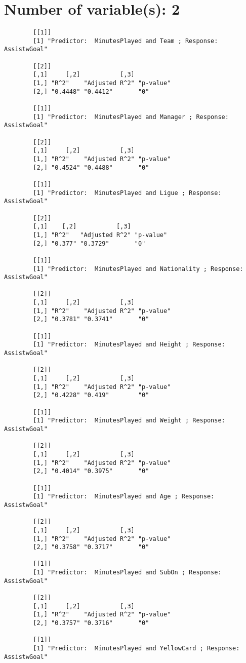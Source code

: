 \documentclass[12pt]{article}
\begin{document}
	\section{Number of variable(s): 2}
	\begin{verbatim}
		[[1]]
		[1] "Predictor:  MinutesPlayed and Team ; Response:  AssistwGoal"
		
		[[2]]
		[,1]     [,2]           [,3]     
		[1,] "R^2"    "Adjusted R^2" "p-value"
		[2,] "0.4448" "0.4412"       "0"      
		
		[[1]]
		[1] "Predictor:  MinutesPlayed and Manager ; Response:  AssistwGoal"
		
		[[2]]
		[,1]     [,2]           [,3]     
		[1,] "R^2"    "Adjusted R^2" "p-value"
		[2,] "0.4524" "0.4488"       "0"      
		
		[[1]]
		[1] "Predictor:  MinutesPlayed and Ligue ; Response:  AssistwGoal"
		
		[[2]]
		[,1]    [,2]           [,3]     
		[1,] "R^2"   "Adjusted R^2" "p-value"
		[2,] "0.377" "0.3729"       "0"      
		
		[[1]]
		[1] "Predictor:  MinutesPlayed and Nationality ; Response:  AssistwGoal"
		
		[[2]]
		[,1]     [,2]           [,3]     
		[1,] "R^2"    "Adjusted R^2" "p-value"
		[2,] "0.3781" "0.3741"       "0"      
		
		[[1]]
		[1] "Predictor:  MinutesPlayed and Height ; Response:  AssistwGoal"
		
		[[2]]
		[,1]     [,2]           [,3]     
		[1,] "R^2"    "Adjusted R^2" "p-value"
		[2,] "0.4228" "0.419"        "0"      
		
		[[1]]
		[1] "Predictor:  MinutesPlayed and Weight ; Response:  AssistwGoal"
		
		[[2]]
		[,1]     [,2]           [,3]     
		[1,] "R^2"    "Adjusted R^2" "p-value"
		[2,] "0.4014" "0.3975"       "0"      
		
		[[1]]
		[1] "Predictor:  MinutesPlayed and Age ; Response:  AssistwGoal"
		
		[[2]]
		[,1]     [,2]           [,3]     
		[1,] "R^2"    "Adjusted R^2" "p-value"
		[2,] "0.3758" "0.3717"       "0"      
		
		[[1]]
		[1] "Predictor:  MinutesPlayed and SubOn ; Response:  AssistwGoal"
		
		[[2]]
		[,1]     [,2]           [,3]     
		[1,] "R^2"    "Adjusted R^2" "p-value"
		[2,] "0.3757" "0.3716"       "0"      
		
		[[1]]
		[1] "Predictor:  MinutesPlayed and YellowCard ; Response:  AssistwGoal"
		

\end{verbatim}
\end{document}
